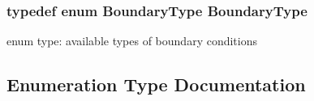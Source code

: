 \subsubsection[{\texorpdfstring{Boundary\+Type}{BoundaryType}}]{\setlength{\rightskip}{0pt plus 5cm}typedef enum {\bf Boundary\+Type}  {\bf Boundary\+Type}}\hypertarget{scenarios_2SWE__Scenario_8hh_a0076a482278ddc13ed179c6c76c9b5ad}{}\label{scenarios_2SWE__Scenario_8hh_a0076a482278ddc13ed179c6c76c9b5ad}
enum type\+: available types of boundary conditions 

\subsection{Enumeration Type Documentation}

